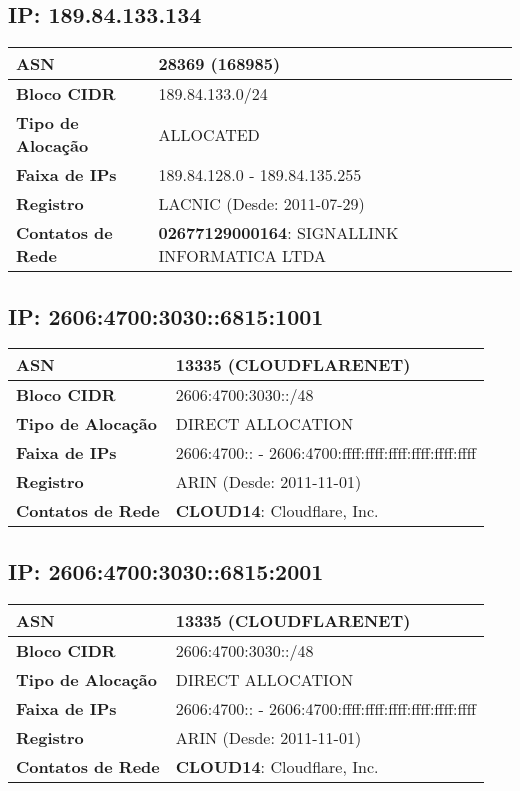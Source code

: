     \subsection{IP: 189.84.133.134}
    \begin{tabular}{|l|l|}
    \hline
    \textbf{ASN} & 28369 (168985) \\ \hline
    \textbf{Bloco CIDR} & 189.84.133.0/24 \\ \hline
    \textbf{Tipo de Alocação} & ALLOCATED \\ \hline
    \textbf{Faixa de IPs} & 189.84.128.0 - 189.84.135.255 \\ \hline
    \textbf{Registro} & LACNIC (Desde: 2011-07-29) \\ \hline
        
\textbf{Contatos de Rede} & \textbf{02677129000164}: SIGNALLINK INFORMATICA LTDA 
\\ \hline
\end{tabular}


    \subsection{IP: 2606:4700:3030::6815:1001}
    \begin{tabular}{|l|l|}
    \hline
    \textbf{ASN} & 13335 (CLOUDFLARENET) \\ \hline
    \textbf{Bloco CIDR} & 2606:4700:3030::/48 \\ \hline
    \textbf{Tipo de Alocação} & DIRECT ALLOCATION \\ \hline
    \textbf{Faixa de IPs} & 2606:4700:: - 2606:4700:ffff:ffff:ffff:ffff:ffff:ffff \\ \hline
    \textbf{Registro} & ARIN (Desde: 2011-11-01) \\ \hline
        
\textbf{Contatos de Rede} & \textbf{CLOUD14}: Cloudflare, Inc. 
\\ \hline
\end{tabular}


    \subsection{IP: 2606:4700:3030::6815:2001}
    \begin{tabular}{|l|l|}
    \hline
    \textbf{ASN} & 13335 (CLOUDFLARENET) \\ \hline
    \textbf{Bloco CIDR} & 2606:4700:3030::/48 \\ \hline
    \textbf{Tipo de Alocação} & DIRECT ALLOCATION \\ \hline
    \textbf{Faixa de IPs} & 2606:4700:: - 2606:4700:ffff:ffff:ffff:ffff:ffff:ffff \\ \hline
    \textbf{Registro} & ARIN (Desde: 2011-11-01) \\ \hline
        
\textbf{Contatos de Rede} & \textbf{CLOUD14}: Cloudflare, Inc. 
\\ \hline
\end{tabular}


